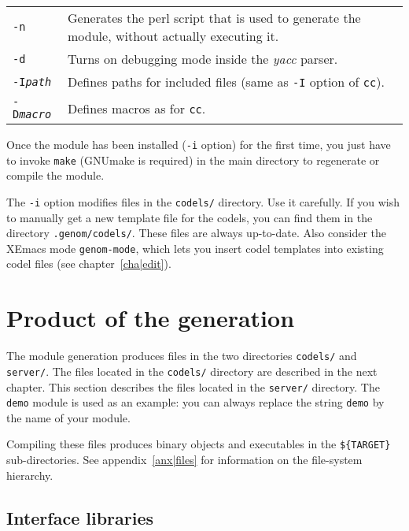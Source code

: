 \begin{description}
\begin{tabularx}{\linewidth}{lX}
\texttt{-n} & Generates the perl script that is used to generate the module,
without actually executing it.\\

\texttt{-d} & Turns on debugging mode inside the \emph{yacc} parser.\\

\texttt{-I\emph{path}} & Defines paths for included files (same as 
\texttt{-I} option of \texttt{cc}).\\

\texttt{-D\emph{macro}} & Defines macros as for \texttt{cc}.\\
\end{tabularx}

Once the module has been installed (\texttt{-i} option)  for the first time,
you just   have to invoke \texttt{make}   (GNUmake is required)  in the main
directory to regenerate or compile the module.

The \texttt{-i} option modifies files in the \texttt{codels/} directory. Use it
carefully.  If you wish  to manually  get a  new   template file for  the
codels, you can find them in the directory \texttt{.genom/codels/}.  These files
are always  up-to-date. Also consider the  XEmacs  mode \texttt{genom-mode},
which lets  you  insert codel templates  into  existing codel files  (see
chapter~\ref{cha|edit}).

\end{description}


\section{Product of the generation}

The module generation produces files in the two directories \texttt{codels/}
and \texttt{server/}.  The files located  in the  \texttt{codels/}  directory are
described in the next chapter.  This  section describes the files located
in  the  \texttt{server/} directory.   The \texttt{demo} module   is  used as an
example: you can always replace the string \texttt{demo} by the name of your
module.

Compiling these files produces binary objects and executables in the 
\texttt{\$\{TARGET\}} sub-\-directories. See appendix~\ref{anx|files} for
information on the file-system hierarchy.

\subsection{Interface libraries}

